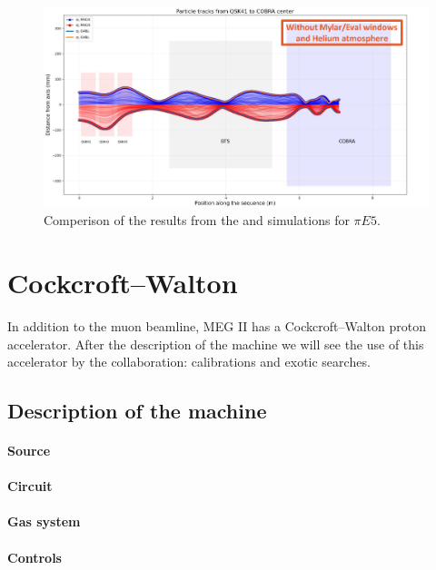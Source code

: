 \begin{refsection}
\begin{figure}
    \centering
    \includegraphics[width = \textwidth]{Figures/MEG/madx_vs_g4b.png}
    \caption{Comperison of the results from the \gfb and \madx simulations for $\pi E5$.}
    \label{fig:madx_vs_g4b}
\end{figure}

\section{Cockcroft–Walton}
In addition to the muon beamline, MEG II has a Cockcroft–Walton proton accelerator. 
After the description of the machine we will see the use of this accelerator by the collaboration: calibrations and exotic searches. 

\subsection{Description of the machine}
\paragraph{Source}
\paragraph{Circuit}
\paragraph{Gas system}
\paragraph{Controls}


\end{refsection}
